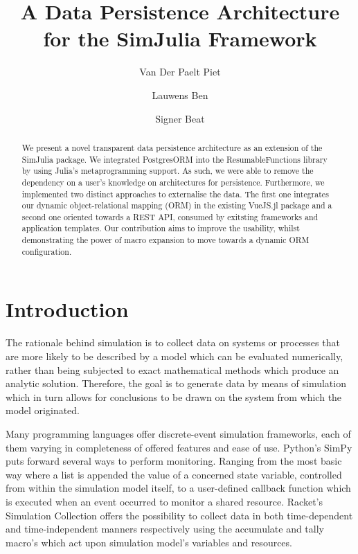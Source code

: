 \documentclass{juliacon}
\begin{document}
%
%

\title{ A Data Persistence Architecture for the SimJulia Framework}

\author[1]{Van Der Paelt Piet}
\author[1]{Lauwens Ben}
\author[2]{Signer Beat}


\maketitle

\begin{abstract}
We present a novel transparent data persistence architecture as an extension of the SimJulia package. We integrated PostgresORM into the ResumableFunctions library by using Julia's metaprogramming support. As such, we were able to remove the dependency on a user's knowledge on architectures for persistence. Furthermore, we implemented two distinct approaches to externalise the data. The first one integrates our dynamic object-relational mapping (ORM) in the existing VueJS.jl package and a second one oriented towards a REST API, consumed by exitsting frameworks and application templates. Our contribution aims to improve the usability, whilst demonstrating the power of macro expansion to move towards a dynamic ORM configuration.
\end{abstract}

\section{Introduction}

The rationale behind simulation is to collect data on systems or processes that are more likely to be described by a model which can be evaluated numerically, rather than being subjected  to exact mathematical methods which produce an analytic solution.\cite{law2007simulation} Therefore, the goal is to generate data by means of simulation which in turn allows for conclusions to be drawn on the system from which the model originated.\vskip 6pt

Many programming languages offer discrete-event simulation frameworks, each of them varying in completeness of offered features and ease of use. Python's \cite{vanrossum2009python} SimPy \cite{SimPy} puts forward several ways to perform monitoring. Ranging from the most basic way where a list is appended the value of a concerned state variable, controlled from within the simulation model itself, to a user-defined callback function which is executed when an event occurred to monitor a shared resource. Racket's \cite{plt-tr1} Simulation Collection \cite{SimulationCollection} offers the possibility to collect data in both time-dependent and time-independent manners respectively using the accumulate and tally macro's which act upon simulation model's variables and resources. \vskip 6pt
\end{document}
